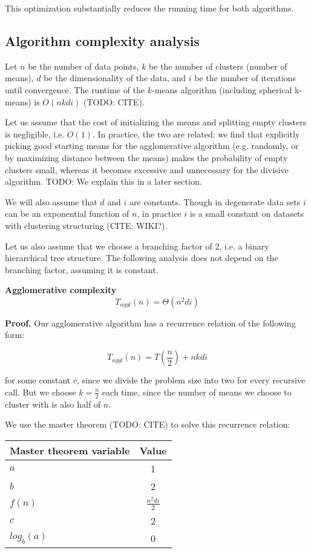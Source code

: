 \documentclass[../tech_report_1.tex]{subfiles}
\begin{document}
This optimization substantially reduces the running time for both algorithms.

\subsection*{Algorithm complexity analysis}

Let $n$ be the number of data points, $k$ be the number of clusters (number of means), $d$ be the dimensionality of the data, and $i$ be the number of iterations until convergence. The runtime of the $k$-means algorithm (including spherical k-means) is $O(nkdi)$ (TODO: CITE).

Let us assume that the cost of initializing the means and splitting empty clusters is negligible, i.e. $O(1)$. In practice, the two are related: we find that explicitly picking good starting means for the agglomerative algorithm (e.g. randomly, or by maximizing distance between the means) makes the probability of empty clusters small, whereas it becomes excessive and unnecessary for the divisive algorithm. TODO: We explain this in a later section.

We will also assume that $d$ and $i$ are constants. Though in degenerate data sets $i$ can be an exponential function of $n$, in practice $i$ is a small constant on datasets with clustering structuring (CITE: WIKI?).

Let us also assume that we choose a branching factor of 2, i.e. a binary hierarchical tree structure. The following analysis does not depend on the branching factor, assuming it is constant.

\begin{theorem}

\textbf{Agglomerative complexity} $$T_{aggl}(n) = \Theta(n^2di)$$

\end{theorem}

\textbf{Proof.} Our agglomerative algorithm has a recurrence relation of the following form:

$$ T_{aggl}(n) = T(\frac{n}{2}) + nkdi $$

for some constant $c$, since we divide the problem size into two for every recursive call. But we choose $k=\frac{n}{2}$ each time, since the number of means we choose to cluster with is also half of $n$.

We use the master theorem (TODO: CITE) to solve this recurrence relation:

\begin{table}[ht]
\centering
\begin{tabular}{l || c }
\hline
\textbf{Master theorem variable} & \textbf{Value} \\
\hline
$a$ & 1 \\
$b$ & 2 \\
$f(n)$ & $\frac{n^2di}{2}$ \\
$c$ & 2 \\
$log_b(a)$ & 0 \\
\hline
\end{tabular}
\end{table}
\end{document}
